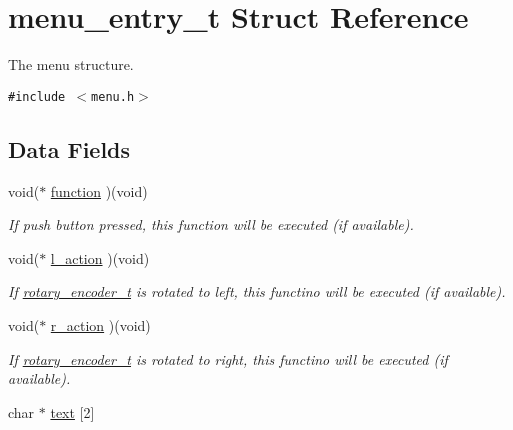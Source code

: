 \hypertarget{structmenu__entry__t}{
\section{menu\_\-entry\_\-t Struct Reference}
\label{structmenu__entry__t}
}
The menu structure.  


{\tt \#include $<$menu.h$>$}

\subsection*{Data Fields}
\begin{CompactItemize}
\item 
\hypertarget{structmenu__entry__t_8e8d27e17ac8715ae3243b8a28b2e953}{
void($\ast$ \hyperlink{structmenu__entry__t_8e8d27e17ac8715ae3243b8a28b2e953}{function} )(void)}
\label{structmenu__entry__t_8e8d27e17ac8715ae3243b8a28b2e953}

\begin{CompactList}\small\item\em If push button pressed, this function will be executed (if available). \item\end{CompactList}\item 
\hypertarget{structmenu__entry__t_86a86c4311b6cf6a653cf4d6a814369b}{
void($\ast$ \hyperlink{structmenu__entry__t_86a86c4311b6cf6a653cf4d6a814369b}{l\_\-action} )(void)}
\label{structmenu__entry__t_86a86c4311b6cf6a653cf4d6a814369b}

\begin{CompactList}\small\item\em If \hyperlink{structrotary__encoder__t}{rotary\_\-encoder\_\-t} is rotated to left, this functino will be executed (if available). \item\end{CompactList}\item 
\hypertarget{structmenu__entry__t_46655e92352000076fa2ad174d5c051e}{
void($\ast$ \hyperlink{structmenu__entry__t_46655e92352000076fa2ad174d5c051e}{r\_\-action} )(void)}
\label{structmenu__entry__t_46655e92352000076fa2ad174d5c051e}

\begin{CompactList}\small\item\em If \hyperlink{structrotary__encoder__t}{rotary\_\-encoder\_\-t} is rotated to right, this functino will be executed (if available). \item\end{CompactList}\item 
\hypertarget{structmenu__entry__t_775b6ff7a7787b730066cba76532a32d}{
char $\ast$ \hyperlink{structmenu__entry__t_775b6ff7a7787b730066cba76532a32d}{text} \mbox{[}2\mbox{]}}
\label{structmenu__entry__t_775b6ff7a7787b730066cba76532a32d}


\end{CompactItemize}
